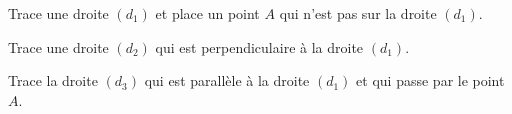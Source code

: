 \begin{myenumerate}
\item Trace une droite $(d_1)$ et place un point $A$ qui n'est pas sur
  la droite $(d_1)$.
\item Trace une droite $(d_2)$ qui est perpendiculaire à la droite
  $(d_1)$.
\item Trace la droite $(d_3)$ qui est parallèle à la droite $(d_1)$ et
  qui passe par le point $A$.
\end{myenumerate}
